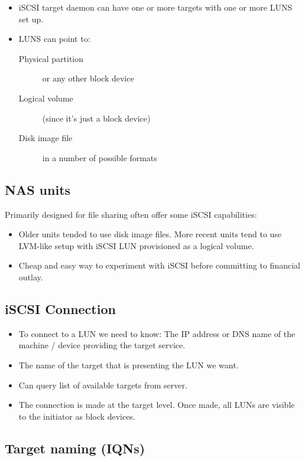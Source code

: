 \documentclass[slides]{pgnotes}
\begin{document}
\begin{itemize}
\item
  iSCSI target daemon can have one or more targets with one or more LUNS
  set up.
\item
  LUNS can point to:

  \begin{description}
  \item[Physical partition]
  or any other block device
  \item[Logical volume]
  (since it's just a block device)
  \item[Disk image file]
  in a number of possible formats
  \end{description}
\end{itemize}


\subsection{NAS units}

Primarily designed for file sharing often offer some iSCSI capabilities:

\begin{itemize}
\item
  Older units tended to use disk image files. More recent units tend to
  use LVM-like setup with iSCSI LUN provisioned as a logical volume.
\item
  Cheap and easy way to experiment with iSCSI before committing to
  financial outlay.
\end{itemize}



\subsection{iSCSI Connection}
\label{sec:connection}

\begin{itemize}
\item
  To connect to a LUN we need to know:  
  The IP address or DNS name of the machine / device providing the target service.
\item
  The name of the target that is presenting the LUN we want.
\item
  Can query list of available targets from server.
\item
  The connection is made at the target level. Once made, all LUNs are
visible to the initiator as block devices.
\end{itemize}


\subsection{Target naming (IQNs)}
\label{sec:target-naming-iqns}
\end{document}
